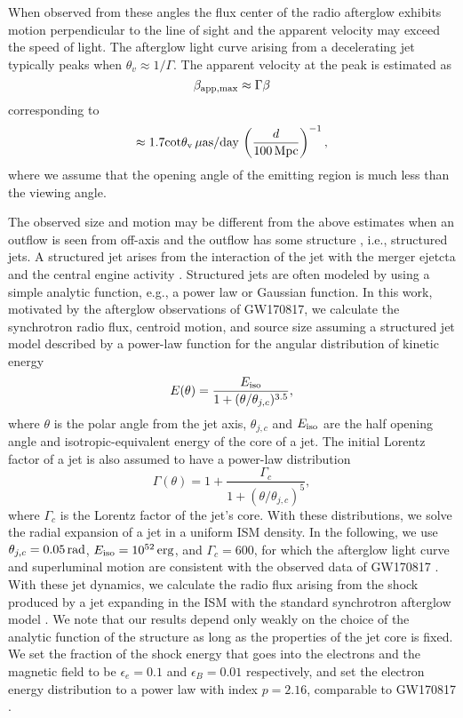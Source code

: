 When observed from these angles the flux center of the radio afterglow exhibits motion perpendicular to the line of sight and the apparent velocity may exceed the speed of light. The afterglow light curve arising from a decelerating jet typically peaks when $\theta_v\approx 1/\Gamma$. The apparent velocity at the peak is estimated as
\begin{equation}
\beta_{\rm app,max} \approx \Gamma \beta
\end{equation}
corresponding to
\begin{equation}
\approx 1.7{\rm cot \theta_v}\,{\rm \mu as/day}\,\left(\frac{d}{100\,{\rm Mpc}}\right)^{-1},
\end{equation}
where we assume that the  opening angle of the emitting region is much less than the viewing angle.

The observed size and motion may be different from the above estimates when an outflow is seen from off-axis and the outflow has some structure , i.e., structured jets. A structured jet arises from the interaction of the jet with the merger ejetcta and the central engine activity \citep{2018MNRAS.479..588G,2018ApJ...863...58X,2018PhRvL.120x1103L}. Structured jets are often modeled by using a simple analytic function, e.g., a power law or Gaussian function. 
In this work, motivated by the  afterglow observations of GW170817, we calculate the synchrotron radio flux, centroid motion, and source size assuming  a structured jet model described by a power-law function for the angular distribution of kinetic energy
\begin{equation}
E(\theta) = \frac{E_{\rm iso}}{1+(\theta/\theta_{j,c})^{3.5}},
\end{equation}
where $\theta$ is the polar angle from the jet axis, $\theta_{j,c}$ and $E_{\rm iso}$ are the half opening angle  and isotropic-equivalent energy of the  core of a jet.
The initial Lorentz factor of a jet is also assumed to have a power-law distribution
\begin{equation}
\Gamma(\theta) = 1+\frac{\Gamma_{c}}{1+(\theta/\theta_{j,c})^5},
\end{equation}
where $\Gamma_c$ is the Lorentz factor of the jet's core. With these distributions, we solve the radial expansion of a jet in a uniform ISM density. 
In the following, we use $\theta_{j,c}=0.05\,{\rm rad}$, $E_{\rm iso}=10^{52}\,{\rm erg}$, and $\Gamma_c=600$, for which  the afterglow light curve and superluminal motion are consistent with the observed data of GW170817 \citep{2019NatAs...3..940H}.
With these jet dynamics, we calculate the radio flux arising from the shock produced by a jet expanding in the ISM with the standard synchrotron afterglow model \citep{1998ApJ...497L..17S}. We note that our results depend only weakly on the choice of the analytic function of the structure as long as the properties of the jet core is fixed.
We set the fraction of the shock energy that goes into the electrons and the magnetic field to be $\epsilon_e=0.1$ and $\epsilon_B=0.01$ respectively, and set the electron energy distribution to a power law with index $p=2.16$, comparable to GW170817 \citep{2018ApJ...868L..11M,2019ApJ...886L..17H}. 

